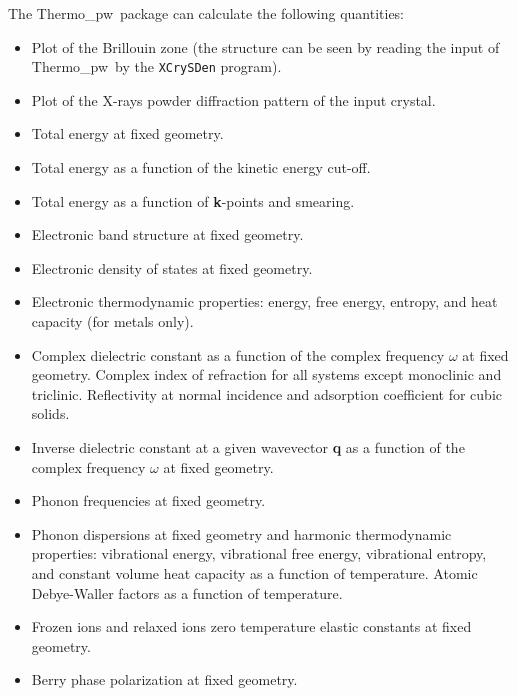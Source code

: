 \documentclass[12pt,a4paper,twoside]{report}
\def\thermo{{\sc Thermo}\_{\sc pw}}
\begin{document}
The \thermo\ package can calculate the following quantities:
\begin{itemize}
\item Plot of the Brillouin zone (the structure can be seen by reading the
input of \thermo\ by the \texttt{XCrySDen} program).

\item Plot of the X-rays powder diffraction pattern of the input crystal.

\item Total energy at fixed geometry.

\item Total energy as a function of the kinetic energy cut-off.

\item Total energy as a function of {\bf k}-points and smearing.

\item Electronic band structure at fixed geometry.

\item Electronic density of states at fixed geometry. 

\item Electronic thermodynamic properties: energy, free energy, entropy, 
and heat capacity (for metals only). 

\item Complex dielectric constant as a function of the complex
frequency $\omega$ at fixed geometry. Complex index of refraction for
all systems except monoclinic and triclinic. Reflectivity at normal
incidence and adsorption coefficient for cubic solids. 

\item Inverse dielectric constant at a given wavevector {\bf q} as a function 
of the complex frequency $\omega$ at fixed geometry.

\item Phonon frequencies at fixed geometry.

\item Phonon dispersions at fixed geometry and harmonic
thermodynamic properties: vibrational energy, vibrational free energy,
vibrational entropy, and constant volume heat capacity as a function of
temperature. Atomic Debye-Waller factors as a function of temperature.

\item Frozen ions and relaxed ions zero temperature elastic constants 
      at fixed geometry.

\item Berry phase polarization at fixed geometry.


\end{itemize}
\end{document}
